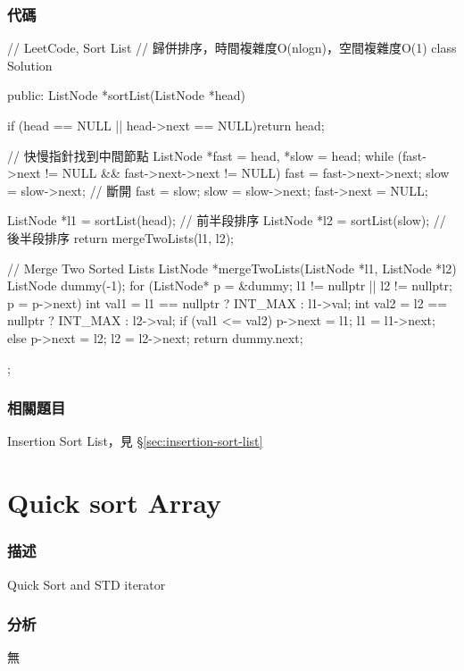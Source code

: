 \subsubsection{代碼}
\begin{Code}
// LeetCode, Sort List
// 歸併排序，時間複雜度O(nlogn)，空間複雜度O(1)
class Solution {
public:
    ListNode *sortList(ListNode *head) {
        if (head == NULL || head->next == NULL)return head;

        // 快慢指針找到中間節點
        ListNode *fast = head, *slow = head;
        while (fast->next != NULL && fast->next->next != NULL) {
            fast = fast->next->next;
            slow = slow->next;
        }
        // 斷開
        fast = slow;
        slow = slow->next;
        fast->next = NULL;

        ListNode *l1 = sortList(head);  // 前半段排序
        ListNode *l2 = sortList(slow);  // 後半段排序
        return mergeTwoLists(l1, l2);
    }

    // Merge Two Sorted Lists
    ListNode *mergeTwoLists(ListNode *l1, ListNode *l2) {
        ListNode dummy(-1);
        for (ListNode* p = &dummy; l1 != nullptr || l2 != nullptr; p = p->next) {
            int val1 = l1 == nullptr ? INT_MAX : l1->val;
            int val2 = l2 == nullptr ? INT_MAX : l2->val;
            if (val1 <= val2) {
                p->next = l1;
                l1 = l1->next;
            } else {
                p->next = l2;
                l2 = l2->next;
            }
        }
        return dummy.next;
    }
};
\end{Code}


\subsubsection{相關題目}
\begindot
\item Insertion Sort List，見 \S \ref{sec:insertion-sort-list}
\myenddot


\section{Quick sort Array} %
\label{sec:quick-sort-array}


\subsubsection{描述}
Quick Sort and STD iterator


\subsubsection{分析}
無


